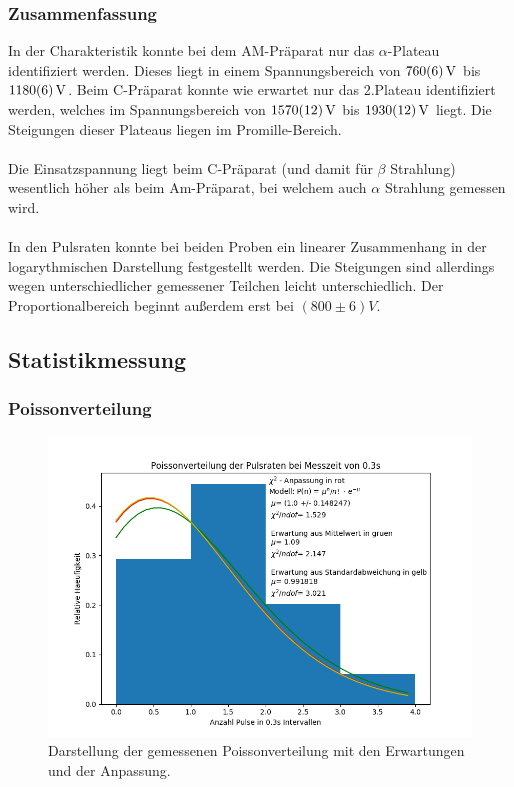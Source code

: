 \documentclass[12pt,a4paper]{article}
\begin{document}
\subsubsection{Zusammenfassung}
In der Charakteristik konnte bei dem AM-Präparat nur das $\alpha$-Plateau identifiziert werden. Dieses liegt in einem Spannungsbereich von $\SI{760\pm 6}{V}$ bis $\SI{1180\pm 6}{V}$. Beim C-Präparat konnte wie erwartet nur das 2.Plateau identifiziert werden, welches im Spannungsbereich von $\SI{1570\pm 12}{V}$ bis $\SI{1930\pm 12}{V}$ liegt. Die Steigungen dieser Plateaus liegen im Promille-Bereich.\\
\\
Die Einsatzspannung liegt beim C-Präparat (und damit für $\beta$ Strahlung) wesentlich höher als beim Am-Präparat, bei welchem auch $\alpha$ Strahlung gemessen wird.\\
\\
In den Pulsraten konnte bei beiden Proben ein linearer Zusammenhang in der logarythmischen Darstellung festgestellt werden. Die Steigungen sind allerdings wegen unterschiedlicher gemessener Teilchen leicht unterschiedlich. Der Proportionalbereich beginnt außerdem erst bei $(800\pm6)V$.
\newpage


\subsection{Statistikmessung}

\subsubsection{Poissonverteilung}
\begin{figure}
\centering
\includegraphics[scale=0.8]{Bilder/poisson.PNG}
\caption{Darstellung der gemessenen Poissonverteilung mit den Erwartungen und der Anpassung.}
\label{fig:Poisson}
\end{figure}
\end{document}
